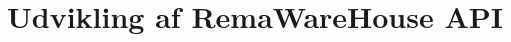 \documentclass[a4paper]{article}
\begin{document}
\section{Udvikling af RemaWareHouse API}
\end{document}
